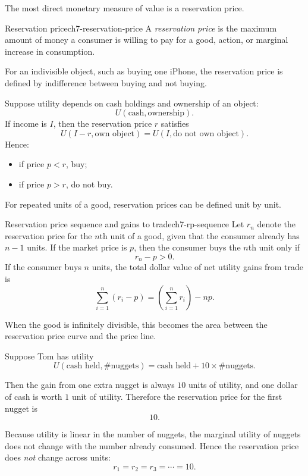The most direct monetary measure of value is a reservation price.

\begin{definition}{Reservation price}{ch7-reservation-price}
A \emph{reservation price} is the maximum amount of money a consumer is willing to pay for a good, action, or marginal increase in consumption.
\end{definition}

For an indivisible object, such as buying one iPhone, the reservation price is defined by indifference between buying and not buying.

\begin{keyformula}[title={Key Formula: Reservation Price for a Discrete Object}]
Suppose utility depends on cash holdings and ownership of an object:
\[
U(\text{cash}, \text{ownership}).
\]
If income is $I$, then the reservation price $r$ satisfies
\[
U(I-r,\text{own object}) = U(I,\text{do not own object}).
\]
Hence:
\begin{itemize}
    \item if price $p<r$, buy;
    \item if price $p>r$, do not buy.
\end{itemize}
\end{keyformula}

For repeated units of a good, reservation prices can be defined unit by unit.

\begin{definition}{Reservation price sequence and gains to trade}{ch7-rp-sequence}
Let $r_n$ denote the reservation price for the $n$th unit of a good, given that the consumer already has $n-1$ units. If the market price is $p$, then the consumer buys the $n$th unit only if
\[
r_n - p > 0.
\]
If the consumer buys $n$ units, the total dollar value of net utility gains from trade is
\[
\sum_{i=1}^{n} (r_i-p)
=
\left(\sum_{i=1}^{n} r_i\right) - np.
\]
\end{definition}

When the good is infinitely divisible, this becomes the area between the reservation price curve and the price line.

\begin{examplebox}[title={Worked Example: reservation price for nuggets}]
Suppose Tom has utility
\[
U(\text{cash held}, \#\text{nuggets}) = \text{cash held} + 10 \times \#\text{nuggets}.
\]

Then the gain from one extra nugget is always $10$ units of utility, and one dollar of cash is worth $1$ unit of utility. Therefore the reservation price for the first nugget is
\[
\boxed{10}.
\]

Because utility is linear in the number of nuggets, the marginal utility of nuggets does not change with the number already consumed. Hence the reservation price does \emph{not} change across units:
\[
r_1=r_2=r_3=\cdots=10.
\]
\end{examplebox}

